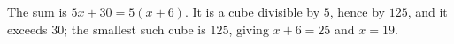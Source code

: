 The sum is $5x+30=5(x+6)$. It is a cube divisible by $5$, hence by $125$, and it exceeds $30$; the smallest such cube is $125$, giving $x+6=25$ and $x=\boxed{19}$.
